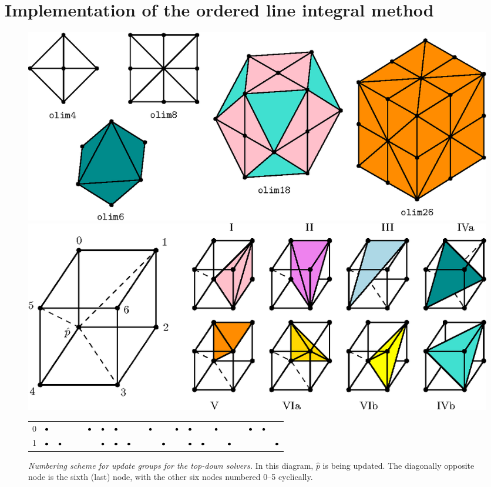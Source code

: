 \documentclass[smallcondensed]{svjour3}
\begin{document}
\section{Implementation of the ordered line integral
  method}\label{sec:implementation}

\begin{figure}
  \centering
  \includegraphics[width=0.95\linewidth]{neighborhoods.eps}
  \caption{\emph{Neighborhoods for the \emph{top-down} family of algorithms.}
    Algorithms \texttt{olim4} and \texttt{olim8} are 2D solvers and
    the rest are 3D solvers. The color coding of tetrahedron updates
    is the same for this figure and figure \ref{fig:octant-numbering}
    below.}\label{fig:neighborhoods}%
  \includegraphics[width=0.95\linewidth]{simplex-groups.eps}
  \caption{\emph{Numbering scheme for update groups for the \emph{top-down} solvers.} In this
    diagram, $\hat{p}$ is being updated. The diagonally opposite node
    is the sixth (last) node, with the other six nodes numbered 0--5
    cyclically.}\label{fig:octant-numbering}
  { \footnotesize
    \vspace{1em}
    \begin{tabular}{c|cccccc|cccccc|cccccc|cc}
      0 & $\bullet$ & & & & $\bullet$ & $\bullet$ & $\bullet$ & & & $\bullet$ & & $\bullet$ & $\bullet$ & & $\bullet$ & & & $\bullet$ & $\bullet$ & \\
      1 & $\bullet$ & $\bullet$ & & & & $\bullet$ & $\bullet$ & $\bullet$ & & & $\bullet$ & & $\bullet$ & $\bullet$ & & $\bullet$ & & & & $\bullet$ \\

\end{tabular}}
\end{figure}
\end{document}
